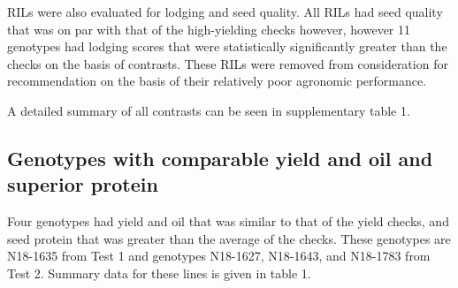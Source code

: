 \documentclass[Agronomy,article,submit,moreauthors,pdftex]{mdpi}
\begin{document}
RILs were also evaluated for lodging and seed quality. All RILs had seed
quality that was on par with that of the high-yielding checks however,
however 11 genotypes had lodging scores that were statistically
significantly greater than the checks on the basis of contrasts. These
RILs were removed from consideration for recommendation on the basis of
their relatively poor agronomic performance.

A detailed summary of all contrasts can be seen in supplementary table
1.

\hypertarget{genotypes-with-comparable-yield-and-oil-and-superior-protein}{%
\subsection{Genotypes with comparable yield and oil and superior
protein}\label{genotypes-with-comparable-yield-and-oil-and-superior-protein}}

Four genotypes had yield and oil that was similar to that of the yield
checks, and seed protein that was greater than the average of the
checks. These genotypes are N18-1635 from Test 1 and genotypes N18-1627,
N18-1643, and N18-1783 from Test 2. Summary data for these lines is
given in table 1.
\end{document}
